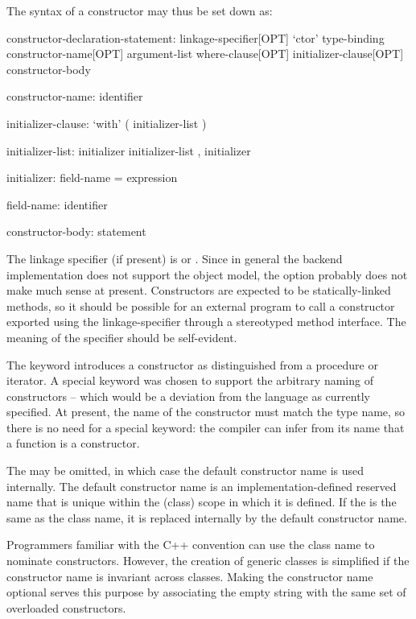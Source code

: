 The syntax of a constructor may thus be set down as:
\begin{syntax}
constructor-declaration-statement:
  linkage-specifier[OPT] `ctor' type-binding constructor-name[OPT] argument-list 
    where-clause[OPT] initializer-clause[OPT] constructor-body

constructor-name:
  identifier

initializer-clause:
  `with' ( initializer-list )

initializer-list:
  initializer
  initializer-list , initializer

initializer:
  field-name = expression

field-name:
  identifier

constructor-body:
  statement
\end{syntax}

The linkage specifier (if present) is   or .  Since
in general the backend implementation does not support the object model, the
 option probably does not make much sense at present.  Constructors are
expected to be statically-linked methods, so it should be possible for an external program
to call a constructor exported using the
 linkage-specifier through a stereotyped method interface.  The meaning of
the  specifier should be self-evident.

The keyword  introduces a constructor as distinguished from a procedure or
iterator.  A special keyword was chosen to support the arbitrary naming of constructors --
which would be a deviation from the language as currently specified.  At present, the name
of the constructor must match the type name, so there is no need for a special keyword:
the compiler can infer from its name that a function is a constructor.

The  may be omitted, in which case the default
constructor name is used internally.  The default constructor name is an
implementation-defined reserved name that is unique within the (class) scope in
which it is defined.  If the  is
the same as the class name, it is replaced internally by the default constructor name.
\begin{rationale}
Programmers familiar with the C++ convention can use the class name to nominate
constructors.  However, the creation of generic classes is simplified if the
constructor name is invariant across classes.  Making the constructor name
optional serves this purpose by associating the empty string with the same set
of overloaded constructors.
\end{rationale}


